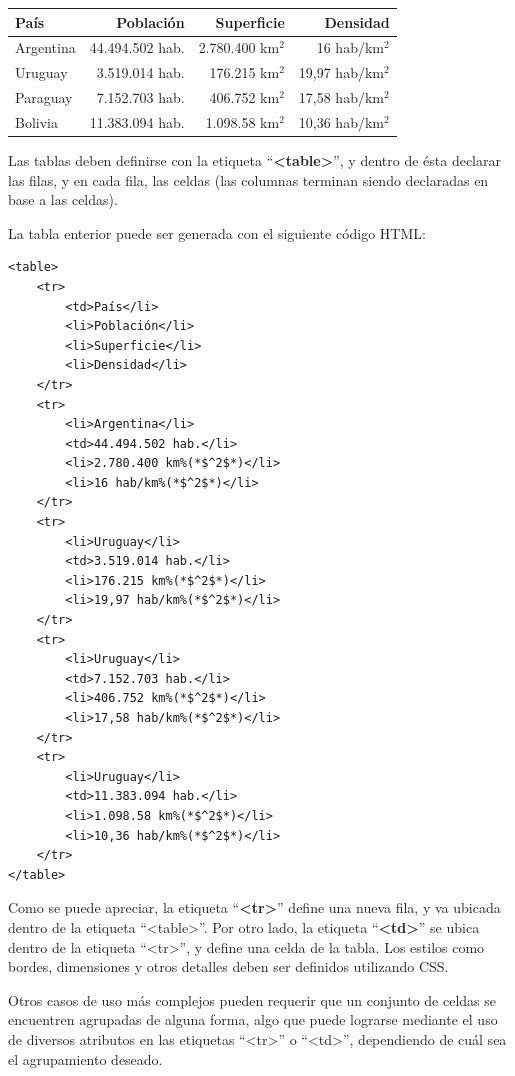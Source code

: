 \begin{tabular}{| l || r | r | r |}
    \hline
    País & Población & Superficie & Densidad \\
    \hline
    \hline
    Argentina & 44.494.502 hab. & 2.780.400 km$^2$ & 16 hab/km$^2$ \\
    \hline
    Uruguay & 3.519.014 hab. & 176.215 km$^2$ & 19,97 hab/km$^2$ \\
    \hline
    Paraguay & 7.152.703 hab. & 406.752 km$^2$ & 17,58 hab/km$^2$ \\
    \hline
    Bolivia & 11.383.094 hab. & 1.098.58 km$^2$ & 10,36 hab/km$^2$ \\
    \hline
\end{tabular}

Las tablas deben definirse con la etiqueta ``\textbf{<table>}'', y dentro de ésta
declarar las filas, y en cada fila, las celdas (las columnas terminan siendo
declaradas en base a las celdas).

La tabla enterior puede ser generada con el siguiente código HTML:

\begin{lstlisting}[language=XHTML]
<table>
    <tr>
        <td>País</li>
        <li>Población</li>
        <li>Superficie</li>
        <li>Densidad</li>
    </tr>
    <tr>
        <li>Argentina</li>
        <td>44.494.502 hab.</li>
        <li>2.780.400 km%(*$^2$*)</li>
        <li>16 hab/km%(*$^2$*)</li>
    </tr>
    <tr>
        <li>Uruguay</li>
        <td>3.519.014 hab.</li>
        <li>176.215 km%(*$^2$*)</li>
        <li>19,97 hab/km%(*$^2$*)</li>
    </tr>
    <tr>
        <li>Uruguay</li>
        <td>7.152.703 hab.</li>
        <li>406.752 km%(*$^2$*)</li>
        <li>17,58 hab/km%(*$^2$*)</li>
    </tr>
    <tr>
        <li>Uruguay</li>
        <td>11.383.094 hab.</li>
        <li>1.098.58 km%(*$^2$*)</li>
        <li>10,36 hab/km%(*$^2$*)</li>
    </tr>
</table>
\end{lstlisting}

Como se puede apreciar, la etiqueta ``\textbf{<tr>}'' define una nueva fila,
y va ubicada dentro de la etiqueta ``<table>''. Por otro lado, la etiqueta
``\textbf{<td>}'' se ubica dentro de la etiqueta ``<tr>'', y define una celda
de la tabla. Los estilos como bordes, dimensiones y otros detalles deben ser
definidos utilizando CSS.

Otros casos de uso más complejos pueden requerir que un conjunto de celdas se
encuentren agrupadas de alguna forma, algo que puede lograrse mediante el uso
de diversos atributos en las etiquetas ``<tr>'' o ``<td>'', dependiendo de cuál
sea el agrupamiento deseado.

